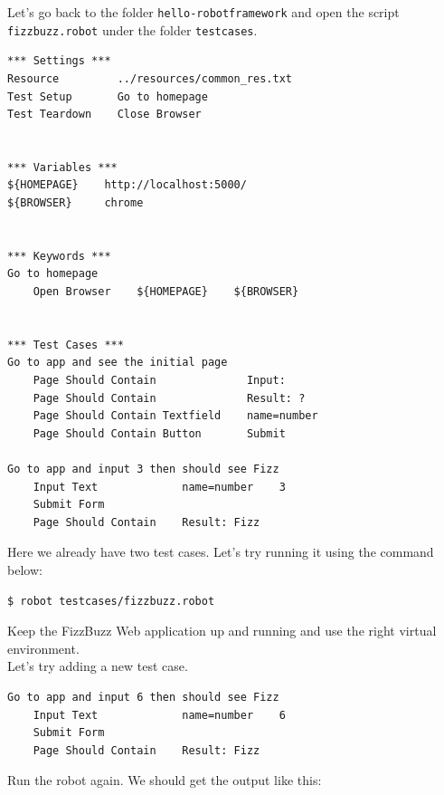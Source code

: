 \documentclass{article}
\begin{document}
\noindent Let's go back to the folder {\tt hello-robotframework} and open the
script {\tt fizzbuzz.robot} under the folder {\tt testcases}.

\begin{verbatim}
*** Settings ***
Resource         ../resources/common_res.txt
Test Setup       Go to homepage
Test Teardown    Close Browser


*** Variables ***
${HOMEPAGE}    http://localhost:5000/
${BROWSER}     chrome


*** Keywords ***
Go to homepage
    Open Browser    ${HOMEPAGE}    ${BROWSER}


*** Test Cases ***
Go to app and see the initial page
    Page Should Contain              Input:
    Page Should Contain              Result: ?
    Page Should Contain Textfield    name=number
    Page Should Contain Button       Submit

Go to app and input 3 then should see Fizz
    Input Text             name=number    3
    Submit Form
    Page Should Contain    Result: Fizz
\end{verbatim}

\noindent Here we already have two test cases. Let's try running it using the
command below:

\begin{verbatim}
$ robot testcases/fizzbuzz.robot
\end{verbatim}

 Keep the FizzBuzz Web application up and running and use
the right virtual environment. \\

\noindent Let's try adding a new test case.

\begin{verbatim}
Go to app and input 6 then should see Fizz
    Input Text             name=number    6
    Submit Form
    Page Should Contain    Result: Fizz
\end{verbatim}

\noindent Run the robot again. We should get the output like this:
\end{document}

